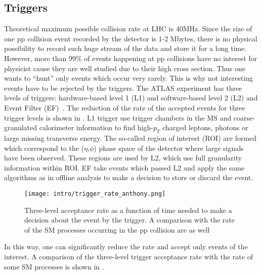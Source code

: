 \subsection{Triggers}
Theoretical maximum possible collision rate at LHC is 40MHz.
Since the size of one pp collision event recorded by the detector is 1-2 Mbytes, there is no physical possibility to record such huge stream of the data and store it for a long time. However, more than 99$\%$ of events happening at pp collisions have no interest for physicist cause they are well studied due to their high cross section. Thus one wants to ``hunt'' only events which occur very rarely. This is why not interesting events have to be rejected by the triggers.
The ATLAS experiment has three levels of triggers: hardware-based level 1 (L1) and software-based level 2 (L2) and Event Filter (EF)~\cite{tdr_tdaq}.
The reduction of the rate of the accepted events for three trigger levels is shown in .
L1 trigger use trigger chambers in the MS and coarse-granulated calorimeter information to find high-$p_T$ charged leptons, photons or large missing transverse energy. The so-called region of interest (ROI) are formed which correspond to the ($\eta$,$\phi$) phase space of the detector where large signals have been observed. These regions are used by L2, which use full granularity information within ROI. EF take events which passed L2 and apply the same algorithms as in offline analysis to make a decision to store or discard the event.

\begin{figure}[h!]
\centering
 \texttt{[image: intro/trigger\_rate\_anthony.png]}
 \caption{Three-level acceptance rate as a function of time needed to make a decision about the event by the trigger. A comparison with the rate of the SM processes occurring in the pp collision are as well~\cite{anthony_thesis}}
\label{fig:trigger_rate}
\end{figure}

In this way, one can significantly reduce the rate and accept only events of the interest. A comparison of the three-level trigger acceptance rate with the rate of some SM processes is shown in .



